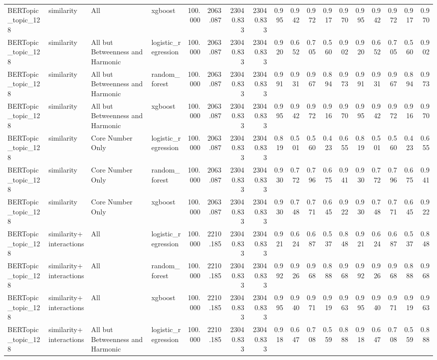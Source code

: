 \begin{tabular}{llllrrrrrrrrrrrrrr}
BERTopic\_topic\_128 & similarity & All & xgboost & 100.000 & 2063.087 & 23040.833 & 23040.833 & 0.995 & 0.942 & 0.972 & 0.917 & 0.970 & 0.995 & 0.942 & 0.972 & 0.917 & 0.970 \\
BERTopic\_topic\_128 & similarity & All but Betweenness and Harmonic & logistic\_regression & 100.000 & 2063.087 & 23040.833 & 23040.833 & 0.920 & 0.652 & 0.705 & 0.560 & 0.902 & 0.920 & 0.652 & 0.705 & 0.560 & 0.902 \\
BERTopic\_topic\_128 & similarity & All but Betweenness and Harmonic & random\_forest & 100.000 & 2063.087 & 23040.833 & 23040.833 & 0.991 & 0.931 & 0.967 & 0.894 & 0.973 & 0.991 & 0.931 & 0.967 & 0.894 & 0.973 \\
BERTopic\_topic\_128 & similarity & All but Betweenness and Harmonic & xgboost & 100.000 & 2063.087 & 23040.833 & 23040.833 & 0.995 & 0.942 & 0.972 & 0.916 & 0.970 & 0.995 & 0.942 & 0.972 & 0.916 & 0.970 \\
BERTopic\_topic\_128 & similarity & Core Number Only & logistic\_regression & 100.000 & 2063.087 & 23040.833 & 23040.833 & 0.819 & 0.501 & 0.560 & 0.423 & 0.655 & 0.819 & 0.501 & 0.560 & 0.423 & 0.655 \\
BERTopic\_topic\_128 & similarity & Core Number Only & random\_forest & 100.000 & 2063.087 & 23040.833 & 23040.833 & 0.930 & 0.772 & 0.796 & 0.675 & 0.941 & 0.930 & 0.772 & 0.796 & 0.675 & 0.941 \\
BERTopic\_topic\_128 & similarity & Core Number Only & xgboost & 100.000 & 2063.087 & 23040.833 & 23040.833 & 0.930 & 0.748 & 0.771 & 0.645 & 0.922 & 0.930 & 0.748 & 0.771 & 0.645 & 0.922 \\
BERTopic\_topic\_128 & similarity+interactions & All & logistic\_regression & 100.000 & 2210.185 & 23040.833 & 23040.833 & 0.921 & 0.624 & 0.687 & 0.537 & 0.848 & 0.921 & 0.624 & 0.687 & 0.537 & 0.848 \\
BERTopic\_topic\_128 & similarity+interactions & All & random\_forest & 100.000 & 2210.185 & 23040.833 & 23040.833 & 0.992 & 0.926 & 0.968 & 0.888 & 0.968 & 0.992 & 0.926 & 0.968 & 0.888 & 0.968 \\
BERTopic\_topic\_128 & similarity+interactions & All & xgboost & 100.000 & 2210.185 & 23040.833 & 23040.833 & 0.995 & 0.940 & 0.971 & 0.919 & 0.963 & 0.995 & 0.940 & 0.971 & 0.919 & 0.963 \\
BERTopic\_topic\_128 & similarity+interactions & All but Betweenness and Harmonic & logistic\_regression & 100.000 & 2210.185 & 23040.833 & 23040.833 & 0.918 & 0.647 & 0.708 & 0.559 & 0.888 & 0.918 & 0.647 & 0.708 & 0.559 & 0.888 \\

\end{tabular}
